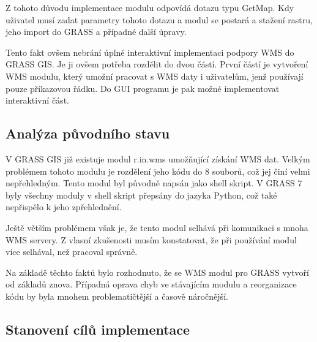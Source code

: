 \documentclass[a4paper,12pt]{article}
\begin{document}
Z tohoto důvodu implementace modulu odpovídá dotazu typu GetMap. Kdy uživatel musí zadat parametry tohoto dotazu a modul se postará a stažení rastru, jeho import do GRASS a případné další úpravy. 


Tento fakt ovšem nebrání úplné interaktivní implementaci podpory WMS do GRASS GIS. Je ji ovšem potřeba rozdělit do dvou částí. První částí je vytvoření WMS modulu, který umožní pracovat s WMS daty i uživatelům, jenž používají
pouze příkazovou řádku.  Do GUI programu je pak možné implementovat interaktivní část.


\subsection{Analýza původního stavu}

 V GRASS GIS již existuje modul r.in.wms umožňující získání WMS dat.
Velkým problémem tohoto modulu je rozdělení jeho kódu do 8 souborů, což jej činí velmi nepřehledným. 
Tento modul byl původně napsán jako shell skript. V GRASS 7 byly všechny moduly v shell skript  přepsány do jazyka Python, což také nepřispělo k jeho zpřehlednění. 

Ještě větším problémem však je, že tento modul selhává při komunikaci s mnoha WMS servery. Z vlasní zkušenosti musím konstatovat, že při používání modul více selhával, než pracoval správně.

Na základě těchto faktů bylo rozhodnuto, že se WMS modul pro GRASS vytvoří od základů znova. Případná oprava chyb ve stávajícím modulu a reorganizace kódu by byla mnohem problematičtější a časově náročnější.

\newpage

\subsection{Stanovení cílů implementace}
\end{document}
